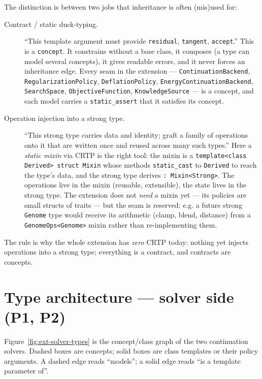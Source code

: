 The distinction is between two jobs that inheritance is often
(mis)used for:
%
\begin{description}
  \item[Contract / static duck-typing.] ``This template argument must
        provide \texttt{residual}, \texttt{tangent}, \texttt{accept}.''
        This is a \texttt{concept}. It constrains without a base class, it
        composes (a type can model several concepts), it gives readable
        errors, and it never forces an inheritance edge. Every seam in the
        extension --- \texttt{ContinuationBackend},
        \texttt{RegularizationPolicy}, \texttt{DeflationPolicy},
        \texttt{EnergyContinuationBackend}, \texttt{SearchSpace},
        \texttt{ObjectiveFunction}, \texttt{KnowledgeSource} --- is a
        concept, and each model carries a \texttt{static\_assert} that it
        satisfies its concept.
  \item[Operation injection into a strong type.] ``This strong type
        carries data and identity; graft a family of operations onto it
        that are written once and reused across many such types.'' Here a
        \emph{static mixin} via CRTP is the right tool: the mixin is a
        \texttt{template<class Derived> struct Mixin} whose methods
        \texttt{static\_cast} to \texttt{Derived} to reach the type's
        data, and the strong type derives \texttt{: Mixin<Strong>}. The
        operations live in the mixin (reusable, extensible), the state
        lives in the strong type. The extension does not \emph{need} a
        mixin yet --- its policies are small structs of traits --- but the
        seam is reserved: e.g. a future strong \texttt{Genome} type would
        receive its arithmetic (clamp, blend, distance) from a
        \texttt{GenomeOps<Genome>} mixin rather than re-implementing them.
\end{description}

The rule is why the whole extension has \emph{zero} CRTP today: nothing
yet injects operations into a strong type; everything is a contract, and
contracts are concepts.

\section{Type architecture --- solver side (P1, P2)}

Figure~\ref{fig:ext-solver-types} is the concept/class graph of the two
continuation solvers. Dashed boxes are concepts; solid boxes are class
templates or their policy arguments. A dashed edge reads ``models''; a
solid edge reads ``is a template parameter of''.


